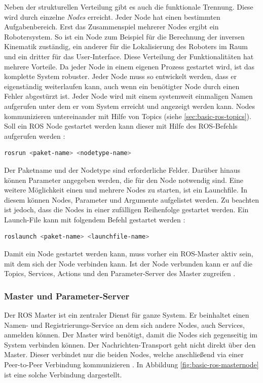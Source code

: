 Neben der strukturellen Verteilung gibt es auch die funktionale Trennung. Diese wird durch einzelne \textit{Nodes} erreicht. Jeder Node hat einen bestimmten Aufgabenbereich. Erst das Zusammenspiel mehrerer Nodes ergibt ein Robotersystem. So ist ein Node zum Beispiel für die Berechnung der inversen Kinematik zuständig, ein anderer für die Lokalisierung des Roboters im Raum und ein dritter für das User-Interface. Diese Verteilung der Funktionalitäten hat mehrere Vorteile. Da jeder Node in einem eigenen Prozess gestartet wird, ist das komplette System robuster. Jeder Node muss so entwickelt werden, dass er eigenständig weiterlaufen kann, auch wenn ein benötigter Node durch einen Fehler abgestürzt ist. Jeder Node wird mit einem systemweit einmaligen Namen aufgerufen unter dem er vom System erreicht und angezeigt werden kann. Nodes kommunizieren untereinander mit Hilfe von Topics (siehe \ref{sec:basic-ros-topics}). Soll ein ROS Node gestartet werden kann dieser mit Hilfe des ROS-Befehls aufgerufen werden \citep{roswiki}:

\begin{lstlisting}[language=bash]
rosrun <paket-name> <nodetype-name>
\end{lstlisting}

Der Paketname und der Nodetype sind erforderliche Felder. Darüber hinaus können Parameter angegeben werden, die für den Node notwendig sind. Eine weitere Möglichkeit einen und mehrere Nodes zu starten, ist ein Launchfile. In diesem können Nodes, Parameter und Argumente aufgelistet werden. Zu beachten ist jedoch, dass die Nodes in einer zufälligen Reihenfolge gestartet werden. Ein Launch-File kann mit folgendem Befehl gestartet werden \citep{roswiki}:

\begin{lstlisting}[language=bash]
roslaunch <paket-name> <launchfile-name>
\end{lstlisting}

Damit ein Node gestartet werden kann, muss vorher ein ROS-Master aktiv sein, mit dem sich der Node verbinden kann. Ist der Node verbunden kann er auf die Topics, Services, Actions und den Parameter-Server des Master zugreifen \citep{roswiki}.

\subsubsection{Master und Parameter-Server}
Der ROS Master ist ein zentraler Dienst für ganze System. Er beinhaltet einen Namen- und Registrierungs-Service an dem sich andere Nodes, auch Services, anmelden können. Der Master wird benötigt, damit die Nodes sich gegenseitig im System verbinden können. Der Nachrichten-Transport geht nicht direkt über den Master. Dieser verbindet nur die beiden Nodes, welche anschließend via einer Peer-to-Peer Verbindung kommunizieren \citep{roswiki}. In Abbildung \ref{fig:basic-ros-masternode} ist eine solche Verbindung dargestellt.

